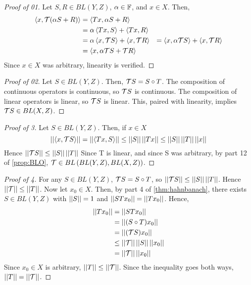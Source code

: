 \begin{prop}[\AdjointOperator]
    \begin{proof}[Proof of 01]
        Let $S,R \in BL(Y,Z)$, 
        $\alpha \in \F$, 
        and $x \in X$. 
        Then, 
        \begin{align*}
            \ip{x, \T(\alpha S+R)} & = \ip{Tx, \alpha S+R}\\
            & = \alpha \ip{Tx, S}+ \ip{Tx, R} \\
            & = \alpha \ip{x, \T S} + \ip{ x, \T R}
            & = \ip{x, \alpha \T S} + \ip{x, \T R} \\
            & = \ip{x, \alpha \T S + \T R}
        \end{align*}
        Since $x \in X$ was arbitrary, linearity is verified. 
    \end{proof}
    \begin{proof}[Proof of 02]
        Let $S \in BL(Y,Z)$. 
        Then, 
        $\T S = S \circ T$. 
        The composition of continuous operators is continuous, so $\T S$ is 
        continuous.
        The composition of linear operators is linear, so $\T S$ is linear.
        This, paired with linearity, implies $\T S \in BL(X,Z)$.
    \end{proof}
    \begin{proof}[Proof of 3]
        Let $S \in BL(Y,Z)$. Then, 
        if $x \in X$
        \begin{equation}
        \norm{\ip{x, \T S}} = \norm{\ip{Tx, S}} \leq \norm{S} \norm{Tx} \leq \norm{S} \norm{T} \norm{x}
        \end{equation}
        Hence $\norm{\T S} \leq \norm{S} \norm{T}$
        Since T is linear, and since S was arbitrary, 
        by part  12 of \ref{prop:BLO}, $\T \in BL\pa{ BL(Y,Z), BL(X,Z)}$.
    \end{proof}
    \begin{proof}[Proof of 4]
        For any $S \in BL(Y,Z)$, 
        $\T S = S \circ T$, so
        $\norm{\T S} \leq \norm{S} \norm{T}$. 
        Hence $\norm{\T} \leq \norm{T}$. 
        Now let $x_0 \in X$. 
        Then, by part 4 of 
        \ref{thm:hahnbanach}, 
        there exists $S \in BL(Y,Z)$ with 
        $\norm{S}=1$
        and $\norm{STx_0} = \norm{Tx_0}$. 
        Hence, 
        \begin{align*}
            \norm{T x_0} & = \norm{S Tx_0} \\
            & = \norm{(S \circ T) x_0} \\
            & = \norm{(\T S) x_0} \\
            & \leq \norm{\T} \norm{S} \norm{x_0}\\
            & = \norm{\T} \norm{x_0}
        \end{align*}
        Since $x_0 \in X$ is arbitrary, $\norm{T} \leq \norm{\T}$. 
        Since the inequality goes both ways, $\norm{T}=\norm{\T}$.


\end{proof}
\end{prop}
